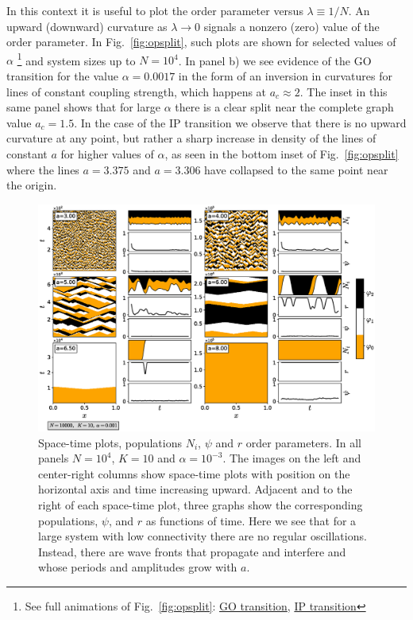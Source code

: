 In this context it is useful to plot the order parameter versus $\lambda\equiv1/N$. An upward (downward) curvature as $\lambda \to 0$
signals a nonzero (zero) value of the order parameter. In Fig.~\ref{fig:opsplit}, such plots are shown for selected values of $\alpha$
\footnote{{See full animations of Fig.~\ref{fig:opsplit}:
\href{https://youtu.be/pPQbc0eiv_4}{GO transition}},
\href{https://youtu.be/_qfNzoBpRO4}{IP transition}}
and system sizes up to $N=10^4$.  In panel b) we see evidence of the GO transition for the value $\alpha=0.0017$ in the form of an
inversion in curvatures for lines of constant coupling strength, which happens at $a_c \approx 2$.  The inset in this same panel shows
that for large $\alpha$ there is a clear split near the complete graph value $a_c=1.5$.  In the case of the IP transition we observe
that there is no upward curvature at any point, but rather a sharp increase in density of the lines of constant $a$ for higher values
of $\alpha$, as seen in the bottom inset of Fig.~\ref{fig:opsplit} where the lines $a=3.375$ and $a=3.306$ have collapsed to the same
point near the origin.

\begin{figure}
\begin{center}
    \includegraphics[width=1.\textwidth]{fig/chap2/articuno_figure_panel.eps}
\caption{\label{fig:trialpanel} Space-time plots, populations $N_i$, $\psi$ and $r$ order parameters. In all panels $N=10^4$, $K=10$
    and $\alpha=10^{-3}$. The images on the left and center-right columns show space-time plots with position on the horizontal axis
    and time increasing upward.  Adjacent and to the right of each space-time plot, three graphs show the corresponding populations,
    $\psi$, and $r$ as functions of time.  Here we see that for a large system with low connectivity there are no regular oscillations.
Instead, there are wave fronts that propagate and interfere and whose periods and amplitudes grow with $a$.  }
\end{center}
\end{figure}

